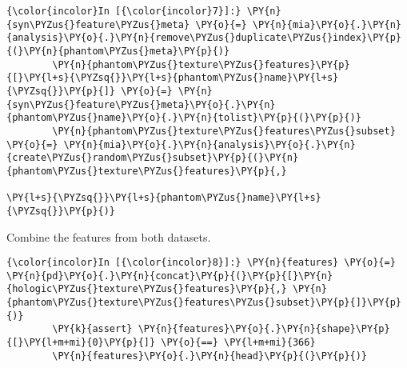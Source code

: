     \begin{Verbatim}[commandchars=\\\{\}]
{\color{incolor}In [{\color{incolor}7}]:} \PY{n}{syn\PYZus{}feature\PYZus{}meta} \PY{o}{=} \PY{n}{mia}\PY{o}{.}\PY{n}{analysis}\PY{o}{.}\PY{n}{remove\PYZus{}duplicate\PYZus{}index}\PY{p}{(}\PY{n}{phantom\PYZus{}meta}\PY{p}{)}
        \PY{n}{phantom\PYZus{}texture\PYZus{}features}\PY{p}{[}\PY{l+s}{\PYZsq{}}\PY{l+s}{phantom\PYZus{}name}\PY{l+s}{\PYZsq{}}\PY{p}{]} \PY{o}{=} \PY{n}{syn\PYZus{}feature\PYZus{}meta}\PY{o}{.}\PY{n}{phantom\PYZus{}name}\PY{o}{.}\PY{n}{tolist}\PY{p}{(}\PY{p}{)}
        \PY{n}{phantom\PYZus{}texture\PYZus{}features\PYZus{}subset} \PY{o}{=} \PY{n}{mia}\PY{o}{.}\PY{n}{analysis}\PY{o}{.}\PY{n}{create\PYZus{}random\PYZus{}subset}\PY{p}{(}\PY{n}{phantom\PYZus{}texture\PYZus{}features}\PY{p}{,}
                                                                            \PY{l+s}{\PYZsq{}}\PY{l+s}{phantom\PYZus{}name}\PY{l+s}{\PYZsq{}}\PY{p}{)}
\end{Verbatim}

    Combine the features from both datasets.

    \begin{Verbatim}[commandchars=\\\{\}]
{\color{incolor}In [{\color{incolor}8}]:} \PY{n}{features} \PY{o}{=} \PY{n}{pd}\PY{o}{.}\PY{n}{concat}\PY{p}{(}\PY{p}{[}\PY{n}{hologic\PYZus{}texture\PYZus{}features}\PY{p}{,} \PY{n}{phantom\PYZus{}texture\PYZus{}features\PYZus{}subset}\PY{p}{]}\PY{p}{)}
        \PY{k}{assert} \PY{n}{features}\PY{o}{.}\PY{n}{shape}\PY{p}{[}\PY{l+m+mi}{0}\PY{p}{]} \PY{o}{==} \PY{l+m+mi}{366}
        \PY{n}{features}\PY{o}{.}\PY{n}{head}\PY{p}{(}\PY{p}{)}
\end{Verbatim}

